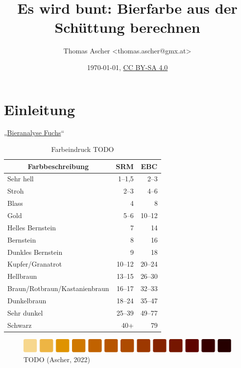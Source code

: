 \documentclass[a4paper,parskip=half]{scrartcl}
\title{Es wird bunt: Bierfarbe aus der Schüttung berechnen}
\author{Thomas Ascher <thomas.ascher@gmx.at>}
\date{\today, \href{http://creativecommons.org/licenses/by-sa/4.0/}{CC BY-SA 4.0}}
\begin{document}
\maketitle

\section*{Einleitung}

„\href{https://bieranalyse.de}{Bieranalyse Fuchs}“


\begin{table}[H]
\centering
\begin{tabular}{lrr}
\toprule
\multicolumn{1}{c}{\textbf{Farbbeschreibung}} & \multicolumn{1}{c}{\textbf{SRM}} & \multicolumn{1}{c}{\textbf{EBC}} \\
\midrule
Sehr hell & 1–1,5 & 2–3  \\
Stroh & 2–3 & 4–6 \\
Blass & 4 & 8 \\
Gold & 5–6 & 10–12 \\
Helles Bernstein & 7 & 14 \\
Bernstein & 8 & 16 \\
Dunkles Bernstein & 9 & 18 \\
Kupfer/Granatrot & 10–12 & 20–24 \\
Hellbraun & 13–15 & 26–30 \\
Braun/Rotbraun/Kastanienbraun & 16–17 & 32–33 \\
Dunkelbraun & 18–24 & 35–47 \\
Sehr dunkel & 25–39 & 49–77 \\
Schwarz & 40+ & 79 \\
\bottomrule
\end{tabular}
\caption{Farbeindruck TODO \parencite{BA2021}}
\label{table:bacolor}
\end{table}

\parencite{BA2021}

\begin{figure}[h]
\centering
\includegraphics[width=14cm]{colorscale.pdf}
\caption{TODO (Ascher, 2022)}
\label{fig:mcucompare}
\end{figure}
\end{document}
